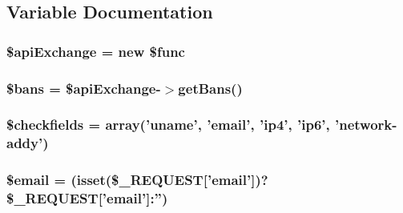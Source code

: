 \subsection{Variable Documentation}
\hypertarget{xortify_2post_8loader_8php_a46e5b84e3958fefa757e6c97dbfec560}{
\subsubsection[{\$api\-Exchange}]{\setlength{\rightskip}{0pt plus 5cm}\$api\-Exchange = new \$func}}\label{xortify_2post_8loader_8php_a46e5b84e3958fefa757e6c97dbfec560}
\hypertarget{xortify_2post_8loader_8php_a4e486549b335a8e8fe6eeb9c4aa0a17c}{
\subsubsection[{\$bans}]{\setlength{\rightskip}{0pt plus 5cm}\$bans = \$api\-Exchange-\/$>$get\-Bans()}}\label{xortify_2post_8loader_8php_a4e486549b335a8e8fe6eeb9c4aa0a17c}
\hypertarget{xortify_2post_8loader_8php_afaeb0aa23d13e417fcfa6b008f397c71}{
\subsubsection[{\$checkfields}]{\setlength{\rightskip}{0pt plus 5cm}\$checkfields = array('uname', 'email', 'ip4', 'ip6', 'network-\/addy')}}\label{xortify_2post_8loader_8php_afaeb0aa23d13e417fcfa6b008f397c71}
\hypertarget{xortify_2post_8loader_8php_ad634f418b20382e2802f80532d76d3cd}{
\subsubsection[{\$email}]{\setlength{\rightskip}{0pt plus 5cm}\$email = (isset(\$\-\_\-\-R\-E\-Q\-U\-E\-S\-T\mbox{[}'email'\mbox{]})?\$\-\_\-\-R\-E\-Q\-U\-E\-S\-T\mbox{[}'email'\mbox{]}\-:'')}}\label{xortify_2post_8loader_8php_ad634f418b20382e2802f80532d76d3cd}
